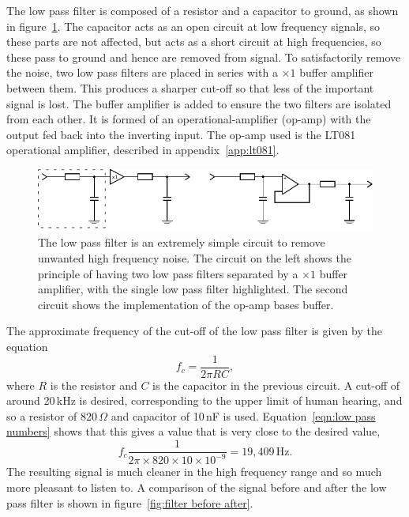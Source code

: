 The low pass filter is composed of a resistor and a capacitor to ground, as shown in figure~\ref{fig:low_pass}. The capacitor acts as an open circuit at low frequency signals, so these parts are not affected, but acts as a short circuit at high frequencies, so these pass to ground and hence are removed from signal. To satisfactorily remove the noise, two low pass filters are placed in series with a $\times 1$ buffer amplifier between them. This produces a sharper cut-off so that less of the important signal is lost. The buffer amplifier is added to ensure the two filters are isolated from each other. It is formed of an operational-amplifier (op-amp) with the output fed back into the inverting input. The op-amp used is the LT081 operational amplifier, described in appendix~\ref{app:lt081}.

\begin{figure}[htbp]
	\begin{center}
		\includegraphics[width=\textwidth]{report_img/buffer_amp}
		\caption{The low pass filter is an extremely simple circuit to remove unwanted high frequency noise. The circuit on the left shows the principle of having two low pass filters separated by a $\times 1$ buffer amplifier, with the single low pass filter highlighted. The second circuit shows the implementation of the op-amp bases buffer.}
		\label{fig:low_pass}
	\end{center}
\end{figure}

The approximate frequency of the cut-off of the low pass filter is given by the equation
\begin{equation}
	f_c = \frac{1}{2\pi RC},
\end{equation}
where $R$ is the resistor and $C$ is the capacitor in the previous circuit. A cut-off of around 20\,kHz is desired, corresponding to the upper limit of human hearing, and so a resistor of 820\,$\Omega$ and capacitor of 10\,nF is used. Equation~\ref{eqn:low pass numbers} shows that this gives a value that is very close to the desired value,
\begin{equation}
		f_c \frac{1}{2\pi\times 820 \times 10 \times 10^{-9}} = 19,409\,\text{Hz}.
		\label{eqn:low pass numbers}
\end{equation}
The resulting signal is much cleaner in the high frequency range and so much more pleasant to listen to. A comparison of the signal before and after the low pass filter is shown in figure~\ref{fig:filter before after}.

